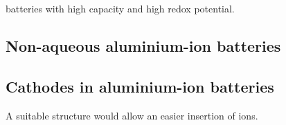 batteries with high capacity and high redox potential.

\subsection{Non-aqueous aluminium-ion batteries}

\subsection{Cathodes in aluminium-ion batteries}
A suitable structure would allow an easier insertion of ions. 